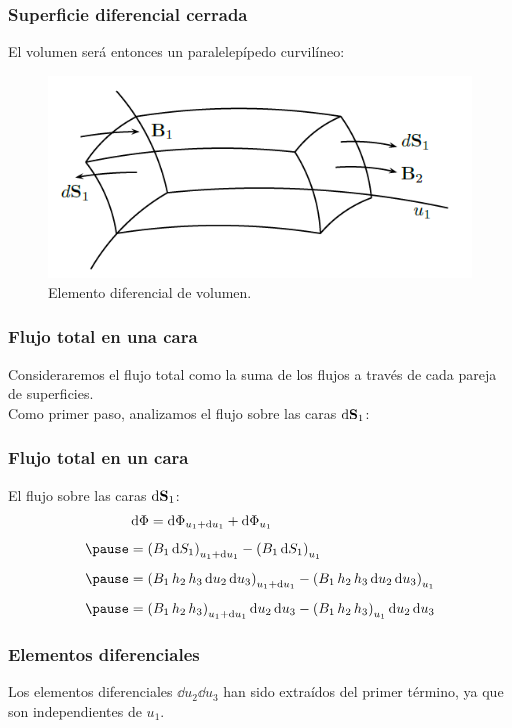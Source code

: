 \documentclass[12pt]{beamer}
\begin{document}
\begin{frame}
\frametitle{Superficie diferencial cerrada}
El volumen será entonces un paralelepípedo curvilíneo:
\begin{figure}[h!]
    \centering
    \includegraphics[scale=0.5]{Imagenes/Diferencial_Volumen.png}
    \caption{Elemento diferencial de volumen.}
    \label{fig:Diferencial_Volumen}
\end{figure}
\end{frame}
\begin{frame}
\frametitle{Flujo total en una cara}
Consideraremos el flujo total como la suma de los flujos a través de cada pareja de superficies.
\\
\bigskip
\pause
Como primer paso, analizamos el flujo sobre las caras $\dd{\vb{S}_{1}}$:
\end{frame}
\begin{frame}
\frametitle{Flujo total en un cara}
El flujo sobre las caras $\dd{\vb{S}_{1}}$:
\pause
\begin{eqnarray*}
\begin{aligned}
&\dd{\Phi} = \dd{\Phi_{u_{1} + \dd{u_{1}}}} + \dd{\Phi_{u_{1}}} \\[0.5em] \pause
&= \left( B_{1} \dd{S_{1}} \right)_{u_{1} + \dd{u_{1}}} - \left( B_{1} \dd{S_{1}} \right)_{u_{1}} \\[0.5em] \pause
&= \left( B_{1} \, h_{2} \, h_{3} \dd{u_{2}} \dd{u_{3}} \right)_{u_{1} + \dd{u_{1}}} - \left( B_{1} \, h_{2} \, h_{3} \dd{u_{2}} \dd{u_{3}} \right)_{u_{1}} \\[0.5em] \pause
&= \left( B_{1} \, h_{2} \, h_{3} \right)_{u_{1} + \dd{u_{1}}} \dd{u_{2}} \dd{u_{3}} - \left( B_{1} \, h_{2} \, h_{3} \right)_{u_{1}} \dd{u_{2}} \dd{u_{3}}
\end{aligned}
\end{eqnarray*}
\end{frame} 
\begin{frame}
\frametitle{Elementos diferenciales}
Los elementos diferenciales $\dd{u_{2}} \dd{u_{3}}$ han sido extraídos del primer término, ya que son independientes de $u_{1}$.
\end{frame}
\end{document}
